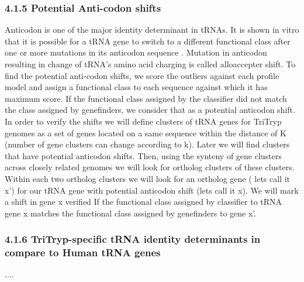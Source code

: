 \documentclass[
12pt, %
a4paper, %
oneside, %
headinclude,footinclude, %
BCOR5mm, %
]{scrartcl}
\begin{document}
\subsubsection*{4.1.5 Potential Anti-codon shifts}
Anticodon is one of the major identity determinant in tRNAs. It is shown in vitro that it is possible for a tRNA gene to switch to a different functional class after one or more mutations in its anticodon sequence \cite{shifts1,shifts2}. Mutation in anticodon resulting in change of tRNA’s amino acid charging is called alloaccepter shift. To find the potential anti-codon shifts, we score the outliers against each profile model and assign a functional class to each sequence against which it has maximum score. If the functional class assigned by the classifier did not match the class assigned by genefinders, we consider that as a potential anticodon shift. In order to verify the shifts we will define clusters of tRNA genes for TriTryp genomes as a set of genes located on a same sequence within the distance of K (number of gene clusters can change according to k). Later we will find clusters that have potential anticodon shifts. Then, using the synteny of gene clusters across closely related genomes we will look for ortholog clusters of these clusters. Within each two ortholog clusters we will look for an ortholog gene ( lets call it x') for our tRNA gene with potential anticodon shift (lets call it x). We will mark a shift in gene x verified If the functional class assigned by classifier to tRNA gene x matches the functional class assigned by genefinders to gene x'.

\subsubsection*{4.1.6 TriTryp-specific tRNA identity determinants in compare to Human tRNA genes}
....
\newpage


\end{document}
